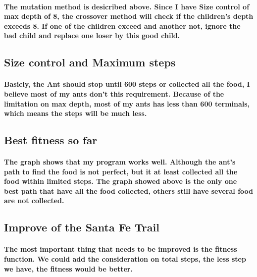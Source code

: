 \documentclass[12pt]{article} %
\begin{document}
\paragraph{The mutation method is desicribed above. Since I have Size control of max depth of 8, the crossover method will check if the children's depth exceeds 8. If one of the children exceed and another not, ignore the bad child and replace one loser by this good child. }

\subsection{Size control and Maximum steps}
\paragraph{Basicly, the Ant should stop until 600 steps or collected all the food, I believe most of my ants don't this requirement. Because of the limitation on max depth, most of my ants has less than 600 terminals, which means the steps will be much less.}

\subsection{Best fitness so far}
\paragraph{The graph shows that my program works well. Although the ant's path to find the food is not perfect, but it at least collected all the food within limited steps. The graph showed above is the only one best path that have all the food collected, others still have several food are not collected.}

\subsection{Improve of the Santa Fe Trail}
\paragraph{The most important thing that needs to be improved is the fitness function. We could add the consideration on total steps, the less step we have, the fitness would be better. }
\end{document}
